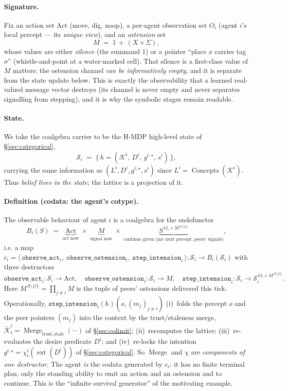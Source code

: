 \documentclass{article}
\newcommand{\method}[1]{\texttt{#1}}
\begin{document}
\paragraph{Signature.} Fix an action set $\mathrm{Act}$ (move, dig, noop), a
per-agent observation set $O_i$ (agent $i$'s local percept --- its
\emph{unique view}), and an \emph{ostension} set
\[
  M \;=\; 1 \,+\, (X\times\Sigma),
\]
whose values are either \emph{silence} (the summand $1$) or a pointer
``place $x$ carries tag $\sigma$'' (whistle-and-point at a water-marked
cell). That silence is a first-class value of $M$ matters: the ostension
channel \emph{can be informatively empty}, and it is separate from the state
update below. This is exactly the observability that a learned real-valued
message vector destroys (its channel is never empty and never separates
signalling from stepping), and it is why the symbolic stages remain
readable.

\paragraph{State.} We take the coalgebra carrier to be the H-MDP high-level
state of \S\ref{sec:categorical},
\[
  \mathcal{S}_i \;=\; \big\{\, h=(\mathcal{K}^i,\,D^i,\,g^{i,\star},\,s^i) \,\big\},
\]
carrying the same information as $(L^i,D^i,g^{i,\star},s^i)$ since
$L^i=\operatorname{Concepts}(\mathcal K^i)$. Thus \emph{belief lives in the
state}; the lattice is a projection of it.

\paragraph{Definition (codata: the agent's cotype).}
The observable behaviour of agent $i$ is a coalgebra for the endofunctor
\[
  B_i(S)\;=\;\underbrace{\mathrm{Act}}_{\text{act now}}\;\times\;
            \underbrace{M}_{\text{signal now}}\;\times\;
            \underbrace{S^{\,O_i\times M^{A\setminus\{i\}}}}_{\text{continue given (my next percept, peers' signals)}},
\]
i.e. a map $c_i=\big\langle\, \method{observe\_act}_i,\ \method{observe\_ostension}_i,\ \method{step\_intension}_i \,\big\rangle : \mathcal{S}_i \to B_i(\mathcal{S}_i)$ with three destructors
\[
  \method{observe\_act}_i:\mathcal{S}_i\to\mathrm{Act},\quad
  \method{observe\_ostension}_i:\mathcal{S}_i\to M,\quad
  \method{step\_intension}_i:\mathcal{S}_i\to \mathcal{S}_i^{\,O_i\times M^{A\setminus\{i\}}} .
\]
Here $M^{A\setminus\{i\}}=\prod_{j\neq i}M$ is the tuple of peers' ostensions
delivered this tick. Operationally, $\method{step\_intension}_i(h)(o,(m_j)_{j\neq i})$
(i)~folds the percept $o$ and the peer pointers $(m_j)$ into the context by
the trust/staleness merge, $\widetilde{\mathcal K}_t^i=\operatorname{Merge}_{\mathrm{trust,stale}}(\cdots)$
of \S\ref{sec:colimit}; (ii)~recomputes the lattice; (iii)~re-evaluates the
desire predicate $D^i$; and (iv)~re-locks the intention
$g^{i,\star}=\chi_t^i(\operatorname{ext}(D^i))$ of \S\ref{sec:categorical}.
So $\operatorname{Merge}$ and $\chi$ are \emph{components of one destructor}.
The agent \emph{is} the codata generated by $c_i$: it has no finite terminal
plan, only the standing ability to emit an action and an ostension and to
continue. This is the ``infinite survival generator'' of the motivating
example.
\end{document}

